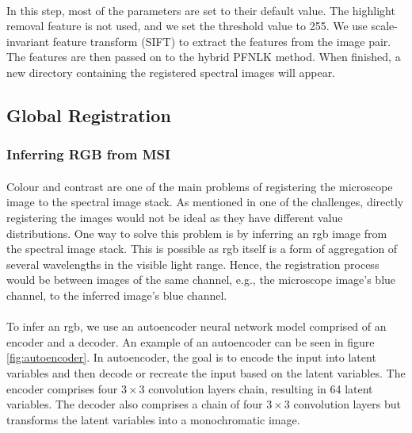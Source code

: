 \documentclass[12pt,oneside]{report}
\begin{document}
\paragraph{}
In this step, most of the parameters are set to their default value. The highlight removal feature is not used, and we set the threshold value to 255. We use scale-invariant feature transform (SIFT) \cite{lowe_object_1999} to extract the features from the image pair. The features are then passed on to the hybrid PFNLK method. When finished, a new directory containing the registered spectral images will appear.


\subsection{Global Registration}

\subsubsection{Inferring RGB from MSI}
\paragraph{}
Colour and contrast are one of the main problems of registering the microscope image to the spectral image stack. As mentioned in one of the challenges, directly registering the images would not be ideal as they have different value distributions. One way to solve this problem is by inferring an \acrshort{rgb} image from the spectral image stack. This is possible as \acrshort{rgb} itself is a form of aggregation of several wavelengths in the visible light range. Hence, the registration process would be between images of the same channel, e.g., the microscope image's blue channel, to the inferred image's blue channel.

\paragraph{}
To infer an \acrshort{rgb}, we use an autoencoder neural network model comprised of an encoder and a decoder. An example of an autoencoder can be seen in figure \ref{fig:autoencoder}. In autoencoder, the goal is to encode the input into latent variables and then decode or recreate the input based on the latent variables. The encoder comprises four $3 \times 3$ convolution layers chain, resulting in 64 latent variables. The decoder also comprises a chain of four $3 \times 3$ convolution layers but transforms the latent variables into a monochromatic image.
\end{document}
